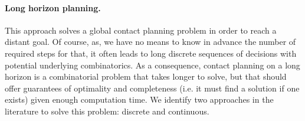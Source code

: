 
\paragraph{Long horizon planning.}
This approach solves a global contact planning problem in order to reach a distant goal. 
Of course, as, we have no means to know in advance the number of required steps for that, it often leads to long discrete sequences of decisions with potential underlying combinatorics.
As a consequence, contact planning on a long horizon is a combinatorial problem that takes longer to solve, but that should offer guarantees of optimality and completeness (i.e. it must find a solution if one exists) given enough computation time.
We identify two approaches in the literature to solve this problem: discrete and continuous.

